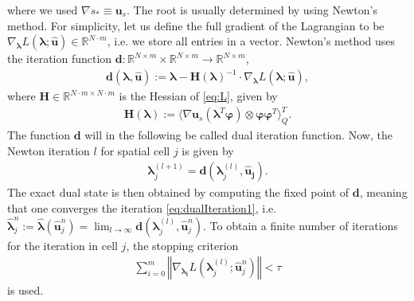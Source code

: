 where we used $\nabla s_* \equiv \bm u_s$. The root is usually determined by using Newton's method. For simplicity, let us define the full gradient of the Lagrangian to be $\nabla_{\bm{\lambda}}L(\bm{\lambda};\bm{\hat{u}})\in\mathbb{R}^{N\cdot m}$, i.e. we store all entries in a vector. Newton's method uses the iteration function $\bm{d}:\mathbb{R}^{N\times m}\times\mathbb{R}^{N\times m}\to\mathbb{R}^{N\times m}$,
\begin{align}\label{eq:dualIterationFunction}
\bm{d}(\bm{\lambda},\bm{\hat{u}}):= \bm{\lambda}-\bm{H}(\bm{\lambda})^{-1}\cdot\nabla_{\bm{\lambda}}L(\bm{\lambda};\bm{\hat{u}}),
\end{align}
where $\bm H\in\mathbb{R}^{N \cdot m\times N\cdot m}$ is the Hessian of \eqref{eq:L}, given by
\begin{align*}
\bm{H}(\bm{\lambda}) := \langle \nabla \bm{u}_{s} (\bm{\lambda}^T\bm{\varphi})\otimes\bm{\varphi}\bm{\varphi}^T\rangle_Q^{T}.
\end{align*}
The function $\bm d$ will in the following be called dual iteration function. Now, the Newton iteration $l$ for spatial cell $j$ is given by
\begin{align}\label{eq:dualIteration1}
\bm{\lambda}^{(l+1)}_j = \bm{d}(\bm{\lambda}_j^{(l)},\bm{\hat{u}_j}).
\end{align}
The exact dual state is then obtained by computing the fixed point of $\bm{d}$, meaning that one converges the iteration \eqref{eq:dualIteration1}, i.e. $\bm{\hat\lambda}_j^n:=\bm{\hat\lambda}(\bm{\hat u}_j^n)=\lim_{l\rightarrow\infty}\bm{d}(\bm{\lambda}_j^{(l)},\bm{\hat{u}}_j^n)$.
To obtain a finite number of iterations for the iteration in cell $j$, the stopping criterion 
\begin{align}\label{eq:tauCrit}
\sum_{i=0}^m\left\Vert \nabla_{\bm{\lambda_i}}L(\bm{\lambda}_j^{(l)};\bm{\hat{u}}_j^n) \right\Vert < \tau
\end{align}
is used.

